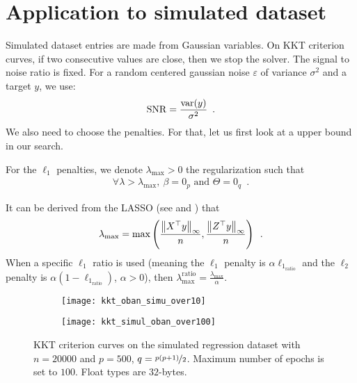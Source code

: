 \documentclass[../main.tex]{subfiles}
\begin{document}
\section{Application to simulated dataset}

Simulated dataset entries are made from Gaussian variables. On KKT criterion
curves, if two consecutive values are close, then we stop the solver.
The signal to noise ratio is fixed.
For a random centered gaussian noise $\varepsilon$ of variance $\sigma^2$
and a target $y$, we use:
\[\mathrm{SNR} = \frac{\operatorname{var}(y)}{\sigma^2}\enspace.\]
We also need to choose the penalties. For that, let us first look at a upper
bound in our search.

\begin{definition}
	For the $\ell_1$ penalties, we denote $\lambda_{\max}>0$ the regularization
	such that
	\begin{align}
		\forall \lambda > \lambda_{\max},\  \beta=0_p \text{ and } \Theta=0_q
		\enspace.
	\end{align}
\end{definition}
%
It can be derived from the LASSO (see  and
\citep{Fercoq_Gramfort_Salmon15}) that
\begin{align}
	\lambda_{\max} = \max\left(\frac{\left \lVert X^\top y \right \rVert_\infty}{n},
							\frac{\left \lVert Z^\top y \right \rVert_\infty}{n}\right)\enspace.
\end{align}
When a specific $\ell_1$ ratio is used (meaning the $\ell_1$ penalty is
$\alpha \ell_{1_\text{ratio}}$ and the $\ell_2$ penalty is
$\alpha(1-\ell_{1_\text{ratio}})$, $\alpha>0$), then
$\lambda_{\max}^{\text{ratio}}=\frac{\lambda_{\max}}{\alpha}$.

\medskip

\begin{figure}[!h]
	\centering
	\begin{subfigure}{.47\textwidth}
		\centering
		\texttt{[image: kkt\_oban\_simu\_over10]}
		\label{fig:simu_ccl}
	\end{subfigure} \hfill
	\begin{subfigure}{.47\textwidth}
		\centering
		\texttt{[image: kkt\_simul\_oban\_over100]}
		\label{fig:simu_ccl_over100}
	\end{subfigure}
	\caption{KKT criterion curves on the simulated regression dataset with
	$n=20000$ and $p=500$, $q=\nicefrac{p(p+1)}{2}$.
	Maximum number of epochs is set to $100$. Float types are $32$-bytes.
	}
\end{figure}
\end{document}

